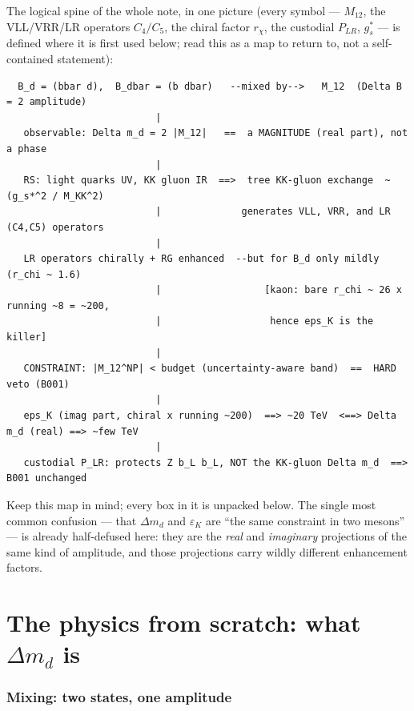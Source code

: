 \documentclass[11pt]{article}
\newcommand{\Mtwelve}{M_{12}}
\newcommand{\dmd}{\Delta m_d}
\newcommand{\epsK}{\varepsilon_K}
\theoremstyle{definition}
\begin{document}
\noindent The logical spine of the whole note, in one picture (every symbol ---
$\Mtwelve$, the VLL/VRR/LR operators $C_4/C_5$, the chiral factor $r_\chi$, the
custodial $P_{LR}$, $g_s^*$ --- is defined where it is first used below; read this
as a map to return to, not a self-contained statement):
\begin{footnotesize}
\begin{verbatim}
  B_d = (bbar d),  B_dbar = (b dbar)   --mixed by-->   M_12  (Delta B = 2 amplitude)
                          |
   observable: Delta m_d = 2 |M_12|   ==  a MAGNITUDE (real part), not a phase
                          |
   RS: light quarks UV, KK gluon IR  ==>  tree KK-gluon exchange  ~ (g_s*^2 / M_KK^2)
                          |              generates VLL, VRR, and LR (C4,C5) operators
                          |
   LR operators chirally + RG enhanced  --but for B_d only mildly (r_chi ~ 1.6)
                          |                  [kaon: bare r_chi ~ 26 x running ~8 = ~200,
                          |                   hence eps_K is the killer]
                          |
   CONSTRAINT: |M_12^NP| < budget (uncertainty-aware band)  ==  HARD veto (B001)
                          |
   eps_K (imag part, chiral x running ~200)  ==> ~20 TeV  <==> Delta m_d (real) ==> ~few TeV
                          |
   custodial P_LR: protects Z b_L b_L, NOT the KK-gluon Delta m_d  ==> B001 unchanged
\end{verbatim}
\end{footnotesize}
\noindent Keep this map in mind; every box in it is unpacked below. The single
most common confusion --- that $\dmd$ and $\epsK$ are ``the same constraint in two
mesons'' --- is already half-defused here: they are the \emph{real} and
\emph{imaginary} projections of the same kind of amplitude, and those projections
carry wildly different enhancement factors.

\part{The physics from scratch: what $\Delta m_d$ is}
\label{part:sm}

\section{Mixing: two states, one amplitude}
\label{sec:mixing}
\end{document}
